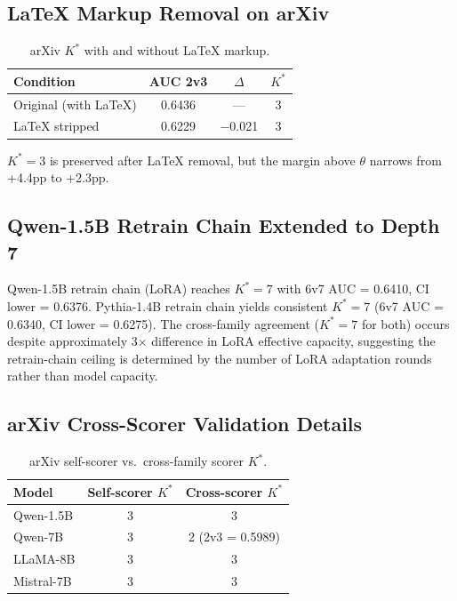 \documentclass[11pt]{article}
\newcommand{\kstar}{K^*}
\newcommand{\thetaval}{\theta}
\begin{document}
\subsection{LaTeX Markup Removal on arXiv}
\label{app:latex}

\begin{table}[h]
\centering
\caption{arXiv $\kstar$ with and without LaTeX markup.}
\label{tab:latex_removal}
\small
\begin{tabular}{lccc}
\toprule
Condition & AUC 2v3 & $\Delta$ & $\kstar$ \\
\midrule
Original (with LaTeX) & 0.6436 & --- & 3 \\
LaTeX stripped & 0.6229 & $-$0.021 & 3 \\
\bottomrule
\end{tabular}
\end{table}

$\kstar{=}3$ is preserved after LaTeX removal, but the margin above $\thetaval$ narrows from +4.4pp to +2.3pp.


\subsection{Qwen-1.5B Retrain Chain Extended to Depth 7}
\label{app:retrain_d7}

Qwen-1.5B retrain chain (LoRA) reaches $\kstar{=}7$ with 6v7 AUC = 0.6410, CI lower = 0.6376. Pythia-1.4B retrain chain yields consistent $\kstar{=}7$ (6v7 AUC = 0.6340, CI lower = 0.6275). The cross-family agreement ($\kstar{=}7$ for both) occurs despite approximately 3$\times$ difference in LoRA effective capacity, suggesting the retrain-chain ceiling is determined by the number of LoRA adaptation rounds rather than model capacity.


\subsection{arXiv Cross-Scorer Validation Details}
\label{app:arxiv_cross}

\begin{table}[h]
\centering
\caption{arXiv self-scorer vs.\ cross-family scorer $\kstar$.}
\label{tab:arxiv_cross}
\small
\begin{tabular}{lcc}
\toprule
Model & Self-scorer $\kstar$ & Cross-scorer $\kstar$ \\
\midrule
Qwen-1.5B & 3 & 3 \\
Qwen-7B & 3 & 2 (2v3 = 0.5989) \\
LLaMA-8B & 3 & 3 \\
Mistral-7B & 3 & 3 \\
\bottomrule
\end{tabular}
\end{table}
\end{document}
